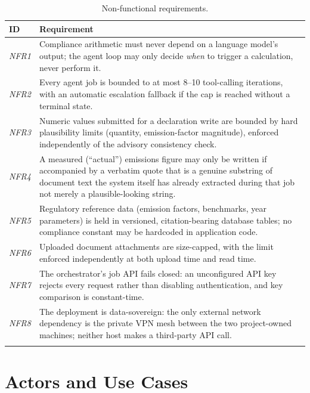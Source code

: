 \renewcommand{\arraystretch}{1.35}
\begin{longtable}{|p{1.3cm}|p{11.8cm}|}
\hline
\textbf{ID} & \textbf{Requirement} \\
\hline
\endhead
\textit{NFR1} & Compliance arithmetic must never depend on a language model's
output; the agent loop may only decide \textit{when} to trigger a
calculation, never perform it. \\
\hline
\textit{NFR2} & Every agent job is bounded to at most 8--10 tool-calling
iterations, with an automatic escalation fallback if the cap is reached
without a terminal state. \\
\hline
\textit{NFR3} & Numeric values submitted for a declaration write are bounded by
hard plausibility limits (quantity, emission-factor magnitude), enforced
independently of the advisory consistency check. \\
\hline
\textit{NFR4} & A measured (``actual'') emissions figure may only be written if
accompanied by a verbatim quote that is a genuine substring of document
text the system itself has already extracted during that job not merely
a plausible-looking string. \\
\hline
\textit{NFR5} & Regulatory reference data (emission factors, benchmarks, year
parameters) is held in versioned, citation-bearing database tables; no
compliance constant may be hardcoded in application code. \\
\hline
\textit{NFR6} & Uploaded document attachments are size-capped, with the limit
enforced independently at both upload time and read time. \\
\hline
\textit{NFR7} & The orchestrator's job API fails closed: an unconfigured API key
rejects every request rather than disabling authentication, and key
comparison is constant-time. \\
\hline
\textit{NFR8} & The deployment is data-sovereign: the only external network
dependency is the private VPN mesh between the two project-owned
machines; neither host makes a third-party API call. \\
\hline
\caption{Non-functional requirements.}
\label{tab:nonfunctional_requirements}
\end{longtable}
\renewcommand{\arraystretch}{1}

\section{Actors and Use Cases}

